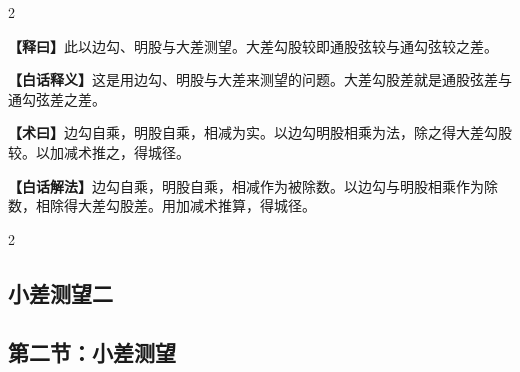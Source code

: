 \documentclass[11pt,a4paper]{article}
\newcommand{\WenExplain}{\textcolor{classicalcolor}{\textbf{【释曰】}}}
\newcommand{\BaiExplain}{\textcolor{moderncolor}{\textbf{【白话释义】}}}
\newcommand{\WenMethod}{\textcolor{classicalcolor}{\textbf{【术曰】}}}
\newcommand{\BaiMethod}{\textcolor{moderncolor}{\textbf{【白话解法】}}}
\begin{document}
\begin{paracol}{2}
\switchcolumn*
\begin{tcolorbox}[colback=red!5,colframe=red!30!black,boxrule=0.3pt]
\WenExplain\quad 此以边勾、明股与大差测望。大差勾股较即通股弦较与通勾弦较之差。
\end{tcolorbox}
\switchcolumn
\begin{tcolorbox}[colback=blue!5,colframe=blue!30!black,boxrule=0.3pt]
\BaiExplain\quad 这是用边勾、明股与大差来测望的问题。大差勾股差就是通股弦差与通勾弦差之差。
\end{tcolorbox}

\switchcolumn*
\begin{tcolorbox}[colback=red!5,colframe=red!40!black,boxrule=0.3pt]
\WenMethod\quad 边勾自乘，明股自乘，相减为实。以边勾明股相乘为法，除之得大差勾股较。以加减术推之，得城径。
\end{tcolorbox}
\switchcolumn
\begin{tcolorbox}[colback=blue!5,colframe=blue!40!black,boxrule=0.3pt]
\BaiMethod\quad 边勾自乘，明股自乘，相减作为被除数。以边勾与明股相乘作为除数，相除得大差勾股差。用加减术推算，得城径。
\end{tcolorbox}

\end{paracol}



\vspace{0.5em}

\begin{paracol}{2}
\subsection*{\textcolor{sectioncolor}{小差测望二}}
\switchcolumn
\subsection*{\textcolor{sectioncolor}{第二节：小差测望}}
\end{paracol}

\vspace{0.5em}
\end{document}
